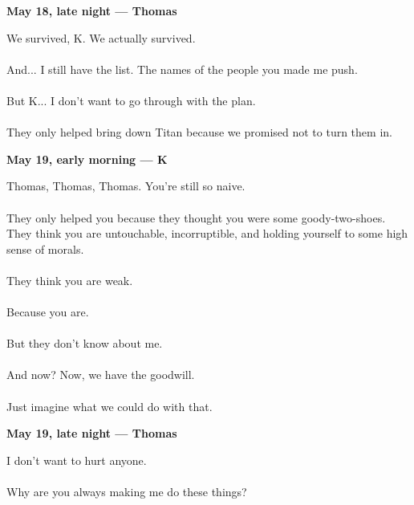 \begin{JournalChat}

\textbf{May 18, late night — Thomas}

\begin{adjustwidth}{2em}{}
    We survived, K.  
    We actually survived.
    \\\\
    And... I still have the list.
    The names of the people you made me push.
    \\\\
    But K... I don’t want to go through with the plan.
    \\\\
    They only helped bring down Titan because  
    we promised not to turn them in.
\end{adjustwidth}

\vspace{1em}

\textbf{May 19, early morning — K}

\begin{adjustwidth}{2em}{}
    Thomas, Thomas, Thomas.  
    You’re still so naive.
    \\\\
    They only helped you because  
    they thought you were some goody-two-shoes.
    They think you are untouchable, incorruptible,  
    and holding yourself to some high sense of morals.
    \\\\
    They think you are weak. 
    \\\\
    Because you are.
    \\\\
    But they don't know about me.
    \\\\
    And now?
    Now, we have the goodwill.
    \\\\
    Just imagine what we could do with that.
\end{adjustwidth}

\vspace{1em}

\textbf{May 19, late night — Thomas}

\begin{adjustwidth}{2em}{}
    I don’t want to hurt anyone.
    \\\\
    Why are you always making me do these things?
\end{adjustwidth}


\end{JournalChat}
